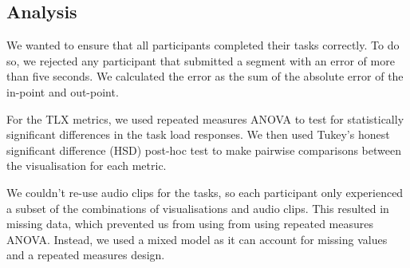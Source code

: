 
\subsection{Analysis}
We wanted to ensure that all participants completed their tasks correctly.  To do so, we rejected any participant that
submitted a segment with an error of more than five seconds. We calculated the error as the sum of the absolute error
of the in-point and out-point.


For the TLX metrics, we used repeated measures ANOVA to test for statistically significant differences in the task load
responses. We then used Tukey's honest significant difference (HSD) post-hoc test to make pairwise comparisons between
the visualisation for each metric.

We couldn't re-use audio clips for the tasks, so each participant only experienced a subset of the combinations of
visualisations and audio clips. This resulted in missing data, which prevented us from using from using repeated
measures ANOVA. Instead, we used a mixed model as it can account for missing values and a repeated measures design.

